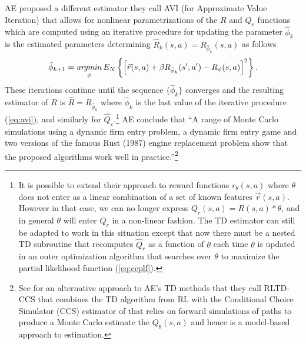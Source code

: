 AE proposed a different  estimator they call AVI (for Approximate Value Iteration) that allows for nonlinear parametrizations
of the $R$ and $Q_\varepsilon$ functions which are computed using an iterative procedure for updating the parameter $\hat\phi_k$ is the estimated
parameters determining $\hat R_k(s,a)=R_{\hat\phi_k}(s,a)$ as follows
\begin{equation}
    \hat\phi_{k+1} = \mathop{\it argmin}_\phi E_N\left\{\left[ \vec{r}(s,a)+\beta R_{\hat\phi_k}(s',a')-R_{\phi}(s,a)\right]^2\right\}.
\label{eq:avi}
\end{equation}
These  iterations continue  until the sequence $\{\hat\phi_k\}$ converges and the resulting estimator of $R$ is $\hat R=R_{\hat\phi_k}$ where
$\hat\phi_k$ is the last value of the iterative procedure (\ref{eq:avi}), and similarly for  $\hat Q_\varepsilon$.\footnote{\footnotesize 
It is possible to extend their approach to reward functions $r_\theta(s,a)$ where $\theta$ does not enter as a linear combination
of a set of known features $\vec{r}(s,a)$. However in that case, we can no longer express $Q_r(s,a)=R(s,a)*\theta$, and in general
$\theta$ will enter $Q_r$ in a non-linear fashion. The TD estimator can still be adapted to work in this situation except
that now there must be a nested TD subroutine that recomputes $\hat Q_r$ as a function of $\theta$ each time $\theta$ is updated
in an outer optimization algorithm that searches over $\theta$ to maximize the partial likelihood function (\ref{eq:ccplf}).}
AE conclude that ``A range of Monte Carlo simulations using a dynamic firm entry problem, a dynamic firm entry game and two versions of the famous Rust (1987) engine replacement problem show that the proposed algorithms work well in practice.''\footnote{\footnotesize
See \citet{khwaja:2025} for an alternative approach to AE's TD methods that they call RLTD-CCS that combines the TD algorithm 
from RL with the Conditional Choice Simulator (CCS) estimator of \citet{hmss:1994} that relies on forward simulations
of paths to produce a Monte Carlo estimate the $Q_\theta(s,a)$  and hence is a model-based approach to estimation.}

